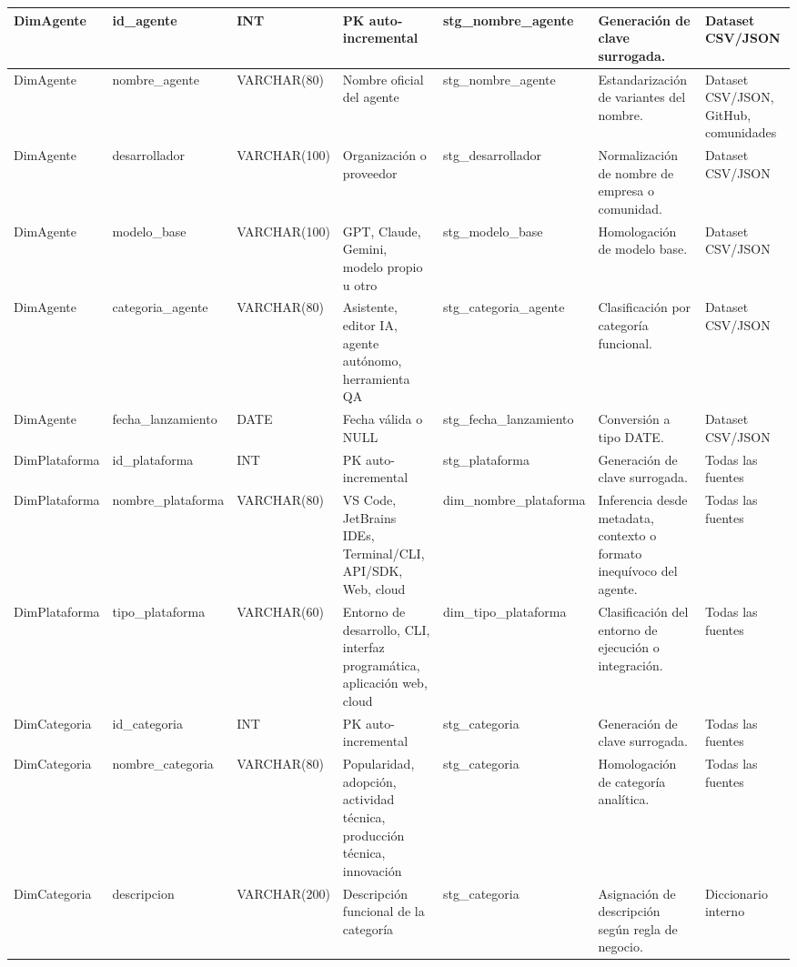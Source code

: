 \documentclass[12pt,a4paper]{article}
\begin{document}
\begin{landscape}
\begin{longtable}{|P{3.55cm}|P{3.05cm}|P{2.35cm}|P{4.00cm}|P{3.95cm}|P{4.95cm}|P{3.05cm}|}
DimAgente & id\_agente & INT & PK auto-incremental & stg\_nombre\_agente & Generación de clave surrogada. & Dataset CSV/JSON \\ \hline
DimAgente & nombre\_agente & VARCHAR(80) & Nombre oficial del agente & stg\_nombre\_agente & Estandarización de variantes del nombre. & Dataset CSV/JSON, GitHub, comunidades \\ \hline
DimAgente & desarrollador & VARCHAR(100) & Organización o proveedor & stg\_desarrollador & Normalización de nombre de empresa o comunidad. & Dataset CSV/JSON \\ \hline
DimAgente & modelo\_base & VARCHAR(100) & GPT, Claude, Gemini, modelo propio u otro & stg\_modelo\_base & Homologación de modelo base. & Dataset CSV/JSON \\ \hline
DimAgente & categoria\_agente & VARCHAR(80) & Asistente, editor IA, agente autónomo, herramienta QA & stg\_categoria\_agente & Clasificación por categoría funcional. & Dataset CSV/JSON \\ \hline
DimAgente & fecha\_lanzamiento & DATE & Fecha válida o NULL & stg\_fecha\_lanzamiento & Conversión a tipo DATE. & Dataset CSV/JSON \\ \hline

DimPlataforma & id\_plataforma & INT & PK auto-incremental & stg\_plataforma & Generación de clave surrogada. & Todas las fuentes \\ \hline
DimPlataforma & nombre\_plataforma & VARCHAR(80) & VS Code, JetBrains IDEs, Terminal/CLI, API/SDK, Web, cloud & dim\_nombre\_plataforma & Inferencia desde metadata, contexto o formato inequívoco del agente. & Todas las fuentes \\ \hline
DimPlataforma & tipo\_plataforma & VARCHAR(60) & Entorno de desarrollo, CLI, interfaz programática, aplicación web, cloud & dim\_tipo\_plataforma & Clasificación del entorno de ejecución o integración. & Todas las fuentes \\ \hline

DimCategoria & id\_categoria & INT & PK auto-incremental & stg\_categoria & Generación de clave surrogada. & Todas las fuentes \\ \hline
DimCategoria & nombre\_categoria & VARCHAR(80) & Popularidad, adopción, actividad técnica, producción técnica, innovación & stg\_categoria & Homologación de categoría analítica. & Todas las fuentes \\ \hline
DimCategoria & descripcion & VARCHAR(200) & Descripción funcional de la categoría & stg\_categoria & Asignación de descripción según regla de negocio. & Diccionario interno \\ \hline


\end{longtable}
\end{landscape}
\end{document}

